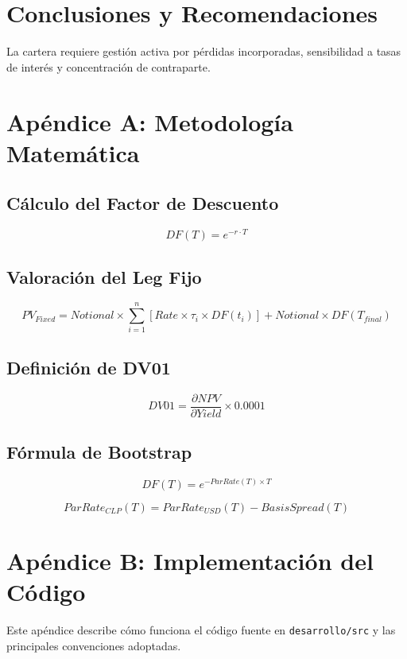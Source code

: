 \section{Conclusiones y Recomendaciones}
La cartera requiere gestión activa por pérdidas incorporadas, sensibilidad a tasas de interés y concentración de contraparte.

\section*{Apéndice A: Metodología Matemática}
\subsection*{Cálculo del Factor de Descuento}
\begin{equation}
DF(T) = e^{-r \cdot T}
\end{equation}

\subsection*{Valoración del Leg Fijo}
\begin{equation}
PV_{Fixed} = Notional \times \sum_{i=1}^{n} \left[ Rate \times \tau_i \times DF(t_i) \right] + Notional \times DF(T_{final})
\end{equation}

\subsection*{Definición de DV01}
\begin{equation}
DV01 = \frac{\partial NPV}{\partial Yield} \times 0.0001
\end{equation}

\subsection*{Fórmula de Bootstrap}
\begin{equation}
DF(T) = e^{-ParRate(T) \times T}
\end{equation}

\begin{equation}
ParRate_{CLP}(T) = ParRate_{USD}(T) - BasisSpread(T)
\end{equation}

\section*{Apéndice B: Implementación del Código}
Este apéndice describe cómo funciona el código fuente en \texttt{desarrollo/src} y las principales convenciones adoptadas.

